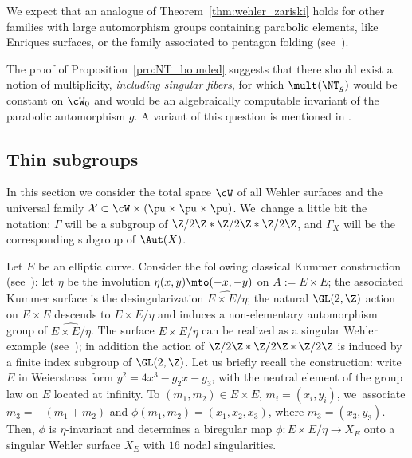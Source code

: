 \begin{rem}
We expect that an analogue of Theorem~\ref{thm:wehler_zariski} holds for other families
with large automorphism groups containing parabolic elements, like Enriques surfaces, or the family associated to pentagon folding (see~\cite{Simons}).
\end{rem}

\begin{rem}
The proof of Proposition~\ref{pro:NT_bounded} suggests that
there should exist a notion of multiplicity, {\textit{including singular fibers}},
for which $\mult(\NT_g)$ would be constant on $\cW_0$ and would be an algebraically
computable invariant of the parabolic automorphism $g$. A variant of this question is mentioned in \cite[Rem.\,7.7.4]{duistermaat}.
\end{rem}

\subsection{Thin subgroups}\label{subs:thin}
In this section we consider the total
space $ \cW$ of all Wehler surfaces and the universal family
$\mathcal X\subset \cW\times (\pu\times \pu\times \pu)$. We~change a
little bit the notation: $\Gamma$ will be a subgroup of $\Z/2\Z\ast\Z/2\Z\ast\Z/2\Z$, and
$\Gamma_{X}$ will be the corresponding subgroup of $\Aut(X)$.

Let $E$ be an elliptic curve. Consider the following classical Kummer construction (see~\cite[\S 4]{finite_orbits}): let $\eta$ be
the involution $\eta (x,y)\mto (-x,-y)$ on $A:=E\times E$; the associated Kummer surface is
the desingularization $\widehat{E\times E/\eta}$; the natural $\GL(2, \Z)$ action on $E\times E$ descends
to $E\times E/\eta$ and
induces a non-elementary automorphism group of $\widehat{E\times E/\eta}$.
The surface $E\times E/\eta$ can be realized as a singular Wehler example
(see~\cite[\S 8.2]{Cantat:Panorama-Synthese}); in addition the action of
$\Z/2\Z\ast\Z/2\Z\ast\Z/2\Z$ is induced by a finite index subgroup of $\GL(2, \Z)$.
Let us briefly recall the construction: write
$E$ in Weierstrass form $y^2 = 4x^3 - g_2x - g_3$, with the neutral element of the group law on
$E$ located at infinity.
To $(m_1, m_2)\in E\times E$, $m_i = (x_i, y_i)$, we~associate $m_3 = - (m_1+m_2)$ and
$\phi(m_1, m_2 ) = (x_1, x_2, x_3)$, where $m_3 = (x_3, y_3)$. Then, $\phi$ is $\eta$-invariant and determines
a biregular map
$\phi: E\times E/\eta\to X_E$ onto a singular Wehler surface $X_E$ with $16$ nodal singularities.

